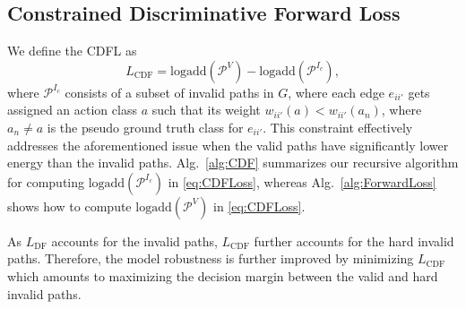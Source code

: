 \documentclass[10pt,twocolumn,letterpaper]{article}
\begin{document}
\subsection{Constrained Discriminative Forward Loss}

We define the CDFL as
\begin{equation}
  L_\text{CDF} = \text{logadd}(\mathcal{P}^V) - \text{logadd}(\mathcal{P}^{I_c}),
  \label{eq:CDFLoss}
\end{equation}
where $\mathcal{P}^{I_c}$ consists of a subset of invalid paths in $G$, where each edge $e_{ii'}$ gets assigned an action class $a$ such that its weight $w_{ii'}(a) < w_{ii'}(a_n)$, where $a_n\ne a$ is the pseudo ground truth class for $e_{ii'}$. This constraint effectively addresses the aforementioned issue when the valid paths have significantly lower energy than the invalid paths. 
Alg.~\ref{alg:CDF} summarizes our recursive algorithm for computing $\text{logadd}(\mathcal{P}^{I_c})$ in \eqref{eq:CDFLoss}, whereas Alg.~\ref{alg:ForwardLoss} shows how to compute $\text{logadd}(\mathcal{P}^V)$ in \eqref{eq:CDFLoss}. 

As $L_\text{DF}$ accounts for the invalid paths,  $L_\text{CDF}$ further accounts for the hard invalid paths. Therefore, the model robustness is further improved by minimizing $L_\text{CDF}$ which amounts to maximizing the decision margin between the valid and hard invalid paths.
\end{document}
